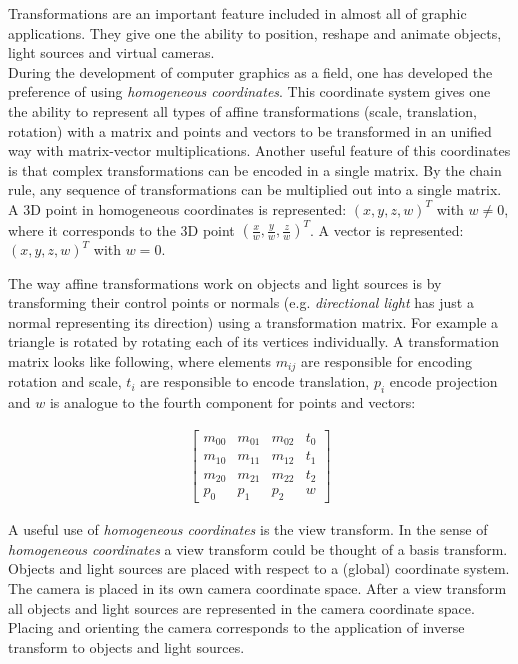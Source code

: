 \documentclass{article}
\begin{document}
\vspace*{\baselineskip}

Transformations are an important feature included in almost all of graphic applications. They give one the ability to position, reshape and animate objects, light sources and virtual cameras. \\
During the development of computer graphics as a field, one has developed the preference of using \textit{homogeneous coordinates}. This coordinate system gives one the ability to represent all types of affine transformations (scale, translation, rotation) with a matrix and points and vectors to be transformed in an unified way with matrix-vector multiplications. Another useful feature of this coordinates is that complex transformations can be encoded in a single matrix. By the chain rule, any sequence of transformations can be multiplied out into a single matrix. A 3D point in homogeneous coordinates is represented: $(x, y, z, w)^{T}$ with $w \neq 0$, where it corresponds to the 3D point $(\frac{x}{w}, \frac{y}{w}, \frac{z}{w})^{T}$. A vector is represented: $(x, y, z, w)^{T}$ with $w = 0$.

\vspace*{\baselineskip}

The way affine transformations work on objects and light sources is by transforming their control points or normals (e.g. \textit{directional light} has just a normal representing its direction) using a transformation matrix. For example a triangle is rotated by rotating each of its vertices individually. A transformation matrix looks like following, where elements $m_{ij}$ are responsible for encoding rotation and scale, $t_{i}$ are responsible to encode translation, $p_{i}$ encode projection and $w$ is analogue to the fourth component for points and vectors: 

\begin{align}
\begin{bmatrix}
	m_{00} & m_{01} & m_{02} & t_{0} \\
	m_{10} & m_{11} & m_{12} & t_{1} \\
	m_{20} & m_{21} & m_{22} & t_{2} \\
	p_{0} & p_{1} & p_{2} & w
\end{bmatrix}
\end{align}

\vspace*{\baselineskip}

A useful use of \textit{homogeneous coordinates} is the view transform. In the sense of \textit{homogeneous coordinates} a view transform could be thought of a basis transform. Objects and light sources are placed with respect to a (global) coordinate system. The camera is placed in its own camera coordinate space. After a view transform all objects and light sources are represented in the camera coordinate space. Placing and orienting the camera corresponds to the application of inverse transform to objects and light sources. 
\end{document}
